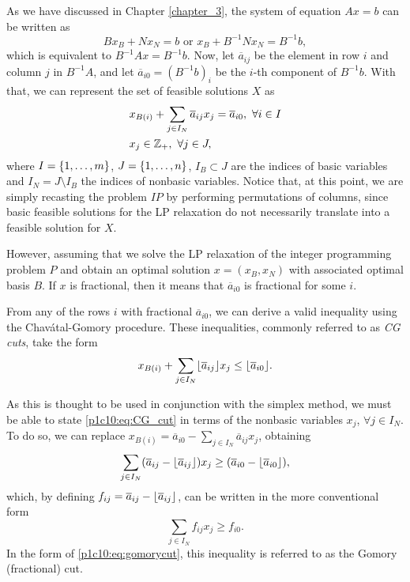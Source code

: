 As we have discussed in Chapter \ref{chapter_3}, the system of equation $Ax= b$ can be written as
%
\begin{equation*}
	Bx_B + Nx_N = b \text{ or } x_B + B^{-1}Nx_N = B^{-1}b,
\end{equation*}
%
which is equivalent to $B^{-1}Ax = B^{-1}b$. Now, let $\overline{a}_{ij}$ be the element in row $i$ and column $j$ in $B^{-1}A$, and let $\overline{a}_{i0} = (B^{-1}b)_i$ be the $i$-th component of $B^{-1}b$. With that, we can represent the set of feasible solutions $X$ as
%
\begin{align*}
	&x_{B(i)} + \sum_{j \in I_N} \overline{a}_{ij}x_j = \overline{a}_{i0}, \ \forall i \in I\\
	&x_j \in \mathbb{Z}_+, \ \forall j \in J,
\end{align*}
%
where $I = \left\{ 1, \dots, m \right \}$, $J = \left\{ 1, \dots, n \right \}$, $I_B \subset J$ are the indices of basic variables and $I_N = J \setminus I_B$ the indices of nonbasic variables. Notice that, at this point, we are simply recasting the problem $IP$ by performing permutations of columns, since basic feasible solutions for the LP relaxation do not necessarily translate into a feasible solution for $X$.

However, assuming that we solve the LP relaxation of the integer programming problem $P$ and obtain an optimal solution $x = (x_B, x_N)$ with associated optimal basis $B$. If $x$ is fractional, then it means that $\overline{a}_{i0}$ is fractional for some $i$.

From any of the rows $i$ with fractional $\overline{a}_{i0}$, we can derive a valid inequality using the Chav\'atal-Gomory procedure. These inequalities, commonly referred to as \emph{CG cuts}, take the form
%
\begin{equation}
	x_{B(i)} + \sum_{j \in I_N} \lfloor \overline{a}_{ij} \rfloor x_j \leq \lfloor \overline{a}_{i0} \rfloor. \label{p1c10:eq:CG_cut}	
\end{equation}

As this is thought to be used in conjunction with the simplex method, we must be able to state \eqref{p1c10:eq:CG_cut} in terms of the nonbasic variables $x_j$, $\forall j \in I_N$. To do so, we can replace $x_{B(i)} = \overline{a}_{i0} - \sum_{j \in I_N} \overline{a}_{ij}x_j$, obtaining
%
\begin{equation*}
	\sum_{j \in I_N} (\overline{a}_{ij} - \lfloor \overline{a}_{ij} \rfloor)x_j \geq (\overline{a}_{i0} - \lfloor \overline{a}_{i0} \rfloor),
\end{equation*}
%
which, by defining $f_{ij} = \overline{a}_{ij} - \lfloor \overline{a}_{ij} \rfloor$, can be written in the more conventional form
%
\begin{equation}
	\sum_{j \in I_N} f_{ij}x_j \geq f_{i0}. \label{p1c10:eq:gomorycut}
\end{equation}
%
In the form of \eqref{p1c10:eq:gomorycut}, this inequality is referred to as the Gomory (fractional) cut. 

